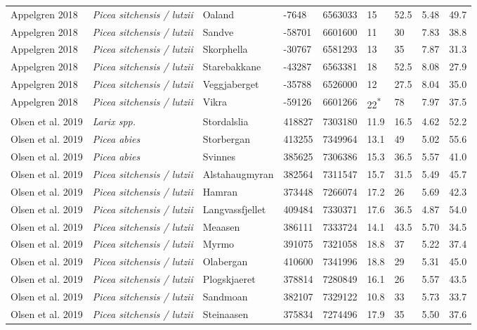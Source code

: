 \documentclass[
]{article}
\begin{document}
\begin{landscape}
\begin{longtable}[t]{l>{}llllllll}
Appelgren 2018 & \em{Picea sitchensis / lutzii} & Oaland & -7648 & 6563033 & 15 & 52.5 & 5.48 & 49.7\\
Appelgren 2018 & \em{Picea sitchensis / lutzii} & Sandve & -58701 & 6601600 & 11 & 30 & 7.83 & 38.8\\
\addlinespace
Appelgren 2018 & \em{Picea sitchensis / lutzii} & Skorphella & -30767 & 6581293 & 13 & 35 & 7.87 & 31.3\\
Appelgren 2018 & \em{Picea sitchensis / lutzii} & Starebakkane & -43287 & 6563381 & 18 & 52.5 & 8.08 & 27.9\\
Appelgren 2018 & \em{Picea sitchensis / lutzii} & Veggjaberget & -35788 & 6526000 & 12 & 27.5 & 8.04 & 35.0\\
Appelgren 2018 & \em{Picea sitchensis / lutzii} & Vikra & -59126 & 6601266 & 22\textsuperscript{*} & 78 & 7.97 & 37.5\\
Olsen et al. 2019 & \em{Larix spp.} & Stordalslia & 418827 & 7303180 & 11.9 & 16.5 & 4.62 & 52.2\\
\addlinespace
Olsen et al. 2019 & \em{Picea abies} & Storbergan & 413255 & 7349964 & 13.1 & 49 & 5.02 & 55.6\\
Olsen et al. 2019 & \em{Picea abies} & Svinnes & 385625 & 7306386 & 15.3 & 36.5 & 5.57 & 41.0\\
Olsen et al. 2019 & \em{Picea sitchensis / lutzii} & Alstahaugmyran & 382564 & 7311547 & 15.7 & 31.5 & 5.49 & 45.7\\
Olsen et al. 2019 & \em{Picea sitchensis / lutzii} & Hamran & 373448 & 7266074 & 17.2 & 26 & 5.69 & 42.3\\
Olsen et al. 2019 & \em{Picea sitchensis / lutzii} & Langvassfjellet & 409484 & 7330371 & 17.6 & 36.5 & 4.87 & 54.0\\
\addlinespace
Olsen et al. 2019 & \em{Picea sitchensis / lutzii} & Meaasen & 386111 & 7333724 & 14.1 & 43.5 & 5.70 & 34.5\\
Olsen et al. 2019 & \em{Picea sitchensis / lutzii} & Myrmo & 391075 & 7321058 & 18.8 & 37 & 5.22 & 37.4\\
Olsen et al. 2019 & \em{Picea sitchensis / lutzii} & Olabergan & 410600 & 7341996 & 18.8 & 29 & 5.31 & 45.0\\
Olsen et al. 2019 & \em{Picea sitchensis / lutzii} & Plogskjaeret & 378814 & 7280849 & 16.1 & 26 & 5.57 & 43.5\\
Olsen et al. 2019 & \em{Picea sitchensis / lutzii} & Sandmoan & 382107 & 7329122 & 10.8 & 33 & 5.73 & 33.7\\
\addlinespace
Olsen et al. 2019 & \em{Picea sitchensis / lutzii} & Steinaasen & 375834 & 7274496 & 17.9 & 35 & 5.50 & 37.6\\

\end{longtable}
\end{landscape}
\end{document}
